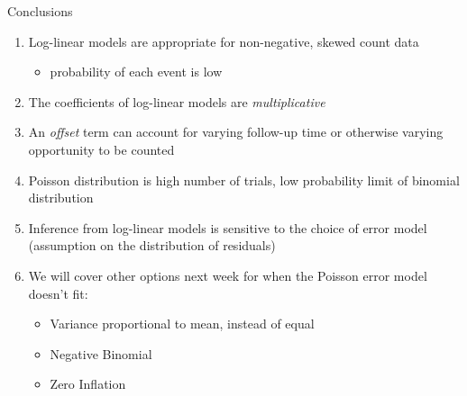\documentclass[ignorenonframetext,]{beamer}
\providecommand{\tightlist}{%
  \setlength{\itemsep}{0pt}\setlength{\parskip}{0pt}}
\begin{document}
\begin{frame}{Conclusions}
\protect\hypertarget{conclusions-1}{}

\begin{enumerate}
\tightlist
\item
  Log-linear models are appropriate for non-negative, skewed count data

  \begin{itemize}
  \tightlist
  \item
    probability of each event is low
  \end{itemize}
\item
  The coefficients of log-linear models are \emph{multiplicative}
\item
  An \emph{offset} term can account for varying follow-up time or
  otherwise varying opportunity to be counted
\item
  Poisson distribution is high number of trials, low probability limit
  of binomial distribution
\item
  Inference from log-linear models is sensitive to the choice of error
  model (assumption on the distribution of residuals)
\item
  We will cover other options next week for when the Poisson error model
  doesn't fit:

  \begin{itemize}
  \tightlist
  \item
    Variance proportional to mean, instead of equal
  \item
    Negative Binomial
  \item
    Zero Inflation
  \end{itemize}
\end{enumerate}

\end{frame}
\end{document}
